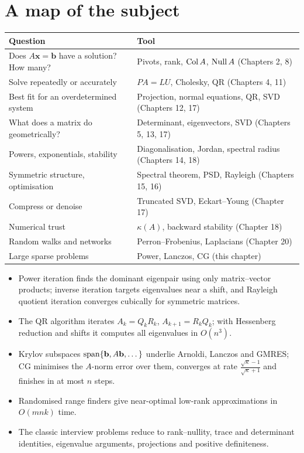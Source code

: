 \section{A map of the subject}

\begin{center}
\begin{tabular}{p{3.6cm}p{9cm}}
\toprule
Question & Tool \\
\midrule
Does $A\mathbf{x}=\mathbf{b}$ have a solution? How many? & Pivots, rank, $\operatorname{Col} A$, $\operatorname{Null} A$ (Chapters 2, 8) \\
Solve repeatedly or accurately & $PA=LU$, Cholesky, QR (Chapters 4, 11) \\
Best fit for an overdetermined system & Projection, normal equations, QR, SVD (Chapters 12, 17) \\
What does a matrix do geometrically? & Determinant, eigenvectors, SVD (Chapters 5, 13, 17) \\
Powers, exponentials, stability & Diagonalisation, Jordan, spectral radius (Chapters 14, 18) \\
Symmetric structure, optimisation & Spectral theorem, PSD, Rayleigh (Chapters 15, 16) \\
Compress or denoise & Truncated SVD, Eckart--Young (Chapter 17) \\
Numerical trust & $\kappa(A)$, backward stability (Chapter 18) \\
Random walks and networks & Perron--Frobenius, Laplacians (Chapter 20) \\
Large sparse problems & Power, Lanczos, CG (this chapter) \\
\bottomrule
\end{tabular}
\end{center}

\begin{summarybox}
\begin{itemize}
  \item Power iteration finds the dominant eigenpair using only matrix--vector products; inverse iteration targets eigenvalues near a shift, and Rayleigh quotient iteration converges cubically for symmetric matrices.
  \item The QR algorithm iterates $A_k=Q_kR_k$, $A_{k+1}=R_kQ_k$; with Hessenberg reduction and shifts it computes all eigenvalues in $O(n^3)$.
  \item Krylov subspaces $\operatorname{span}\{\mathbf{b},A\mathbf{b},\dots\}$ underlie Arnoldi, Lanczos and GMRES; CG minimises the $A$-norm error over them, converges at rate $\frac{\sqrt\kappa-1}{\sqrt\kappa+1}$ and finishes in at most $n$ steps.
  \item Randomised range finders give near-optimal low-rank approximations in $O(mnk)$ time.
  \item The classic interview problems reduce to rank--nullity, trace and determinant identities, eigenvalue arguments, projections and positive definiteness.
\end{itemize}
\end{summarybox}

